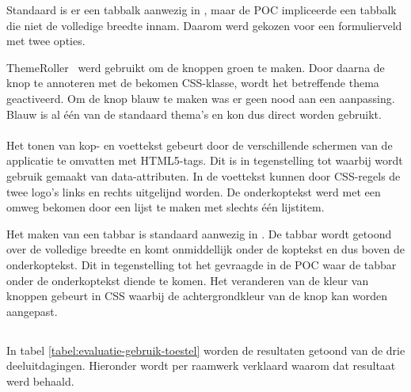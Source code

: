 Standaard is er een tabbalk aanwezig in \jqm, maar de POC impliceerde een tabbalk die niet de volledige breedte innam.
Daarom werd gekozen voor een formulierveld met twee opties.

ThemeRoller~\cite{JQuery2012c} werd gebruikt om de knoppen groen te maken.
Door daarna de knop te annoteren met de bekomen CSS-klasse, wordt het betreffende thema geactiveerd. 
Om de knop blauw te maken was er geen nood aan een aanpassing.
Blauw is al één van de standaard thema's en kon dus direct worden gebruikt.

\paragraph{\lungo}
Het tonen van kop- en voettekst gebeurt door de verschillende schermen van de applicatie te omvatten met HTML5-tags.
Dit is in tegenstelling tot \jqm{} waarbij wordt gebruik gemaakt van data-attributen.
In de voettekst kunnen door CSS-regels de twee logo's links en rechts uitgelijnd worden.
De onderkoptekst werd met een omweg bekomen door een lijst te maken met slechts één lijstitem.

Het maken van een tabbar is standaard aanwezig in \lungo{}.
De tabbar wordt getoond over de volledige breedte en komt onmiddellijk onder de koptekst en dus boven de onderkoptekst.
Dit in tegenstelling tot het gevraagde in de POC waar de tabbar onder de onderkoptekst diende te komen.
Het veranderen van de kleur van knoppen gebeurt in CSS waarbij de achtergrondkleur van de knop kan worden aangepast.


\subsection{}
\label{sec:evaluatie-gebruik-toestel}

In tabel \ref{tabel:evaluatie-gebruik-toestel} worden de resultaten getoond van de drie deeluitdagingen.
Hieronder wordt per raamwerk verklaard waarom dat resultaat werd behaald.

\begin{table}
\centering
{}
\caption{Gebruik van .}
\label{tabel:evaluatie-gebruik-toestel}
\end{table}

